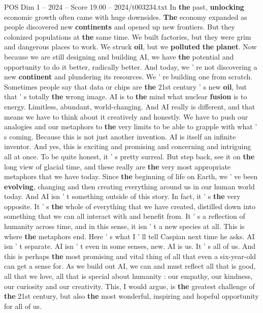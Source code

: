 \begin{textsample}{POS Dim 1 – 2024 – Score 19.00 – 2024/t003234.txt}
In \textbf{the} past, \textbf{unlocking} economic growth often came with huge downsides. \textbf{The} economy expanded as people discovered new \textbf{continents} and opened up new frontiers.
But they colonized populations at \textbf{the} same time.
We built factories, but they were grim and dangerous places to work.
We struck \textbf{oil}, but we \textbf{polluted} \textbf{the} \textbf{planet}.
Now because we are still designing and building AI, we have \textbf{the} potential and opportunity to do it better, radically better.
And today, we ' re not discovering a new \textbf{continent} and plundering its resources.
We ' re building one from scratch.
Sometimes people say that data or chips are \textbf{the} 21st century ' s new \textbf{oil}, but that ' s totally \textbf{the} wrong image.
AI is to \textbf{the} mind what nuclear \textbf{fusion} is to energy.
Limitless, abundant, world-changing.
And AI really is different, and that means we have to think about it creatively and honestly.
We have to push our analogies and our metaphors to \textbf{the} very limits to be able to grapple with what ' s coming.
Because this is not just another invention.
AI is itself an infinite inventor.
And yes, this is exciting and promising and concerning and intriguing all at once.
To be quite honest, it ' s pretty surreal.
But step back, see it on \textbf{the} long view of glacial time, and these really are \textbf{the} very most appropriate metaphors that we have today.
Since \textbf{the} beginning of life on Earth, we ' ve been \textbf{evolving}, changing and then creating everything around us in our human world today.
And AI isn ' t something outside of this story.
In fact, it ' s \textbf{the} very opposite.
It ' s \textbf{the} whole of everything that we have created, distilled down into something that we can all interact with and benefit from.
It ' s a reflection of humanity across time, and in this sense, it isn ' t a new species at all.
This is where \textbf{the} metaphors end.
Here ' s what I ' ll tell Caspian next time he asks.
AI isn ' t separate.
AI isn ' t even in some senses, new.
AI is us.
It ' s all of us.
And this is perhaps \textbf{the} most promising and vital thing of all that even a six-year-old can get a sense for.
As we build out AI, we can and must reflect all that is good, all that we love, all that is special about humanity : our empathy, our kindness, our curiosity and our creativity.
This, I would argue, is \textbf{the} greatest challenge of \textbf{the} 21st century, but also \textbf{the} most wonderful, inspiring and hopeful opportunity for all of us.

\end{textsample}
